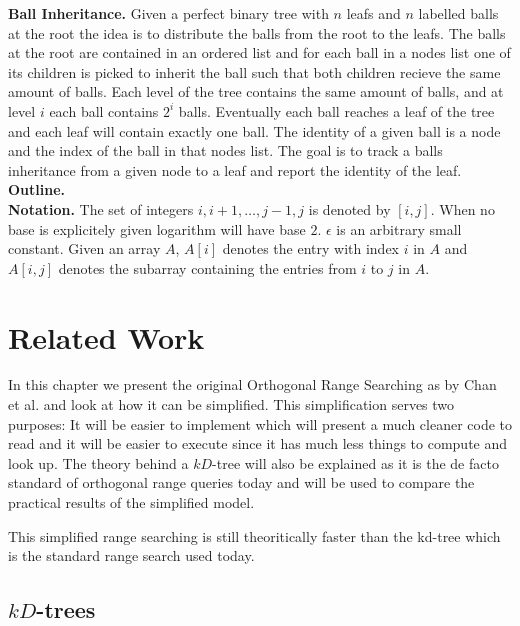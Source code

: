 \documentclass[twoside,11pt,openright]{report}
\begin{document}
\noindent \textbf{Ball Inheritance.} Given a perfect binary tree with $n$ leafs and $n$ labelled balls at the root the idea is to distribute the balls from the root to the leafs. The balls at the root are contained in an ordered list and for each ball in a nodes list one of its children is picked to inherit the ball such that both children recieve the same amount of balls. Each level of the tree contains the same amount of balls, and at level $i$ each ball contains $2^i$ balls. Eventually each ball reaches a leaf of the tree and each leaf will contain exactly one ball. The identity of a given ball is a node and the index of the ball in that nodes list. The goal is to track a balls inheritance from a given node to a leaf and report the identity of the leaf. \\


\noindent \textbf{Outline.} \\

\noindent \textbf{Notation.} The set of integers ${i, i+1, \dots, j-1, j}$ is denoted by $[i,j]$. When no base is explicitely given logarithm will have base $2$. $\epsilon$ is an arbitrary small constant. Given an array $A$, $A[i]$ denotes the entry with index $i$ in $A$ and $A[i,j]$ denotes the subarray containing the entries from $i$ to $j$ in $A$.


\chapter{Related Work}

In this chapter we present the original Orthogonal Range Searching as by Chan et al. and look at how it can be simplified. This simplification serves two purposes: It will be easier to implement which will present a much cleaner code to read and it will be easier to execute since it has much less things to compute and look up. The theory behind a $kD$-tree will also be explained as it is the de facto standard of orthogonal range queries today and will be used to compare the practical results of the simplified model.

This simplified range searching is still theoritically faster than the kd-tree which is the standard range search used today. 

\section{$kD$-trees}
\end{document}
